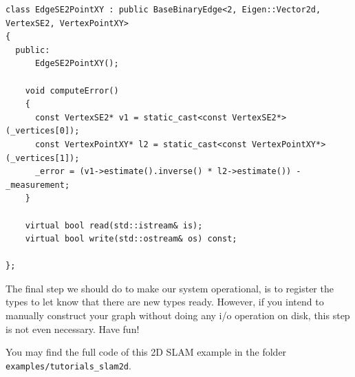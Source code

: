 \documentclass[a4paper]{article}
\begin{document}
\begin{lstlisting}[float,label=lst:edgese2xy,caption=Edge connecting a
  robot poses and a landmark.]
class EdgeSE2PointXY : public BaseBinaryEdge<2, Eigen::Vector2d, VertexSE2, VertexPointXY>
{
  public:
      EdgeSE2PointXY();

    void computeError()
    {
      const VertexSE2* v1 = static_cast<const VertexSE2*>(_vertices[0]);
      const VertexPointXY* l2 = static_cast<const VertexPointXY*>(_vertices[1]);
      _error = (v1->estimate().inverse() * l2->estimate()) - _measurement;
    }

    virtual bool read(std::istream& is);
    virtual bool write(std::ostream& os) const;

};
\end{lstlisting}
The final step we should do to make our system operational, is to
register the types to let \gopt{} know that there are new types ready.
However, if you intend to manually construct your graph without doing
any i/o operation on disk, this step is not even necessary. Have fun!

You may find the full code of this 2D SLAM example in the folder
\texttt{examples/tutorials\_slam2d}.

{\small

}
\end{document}
